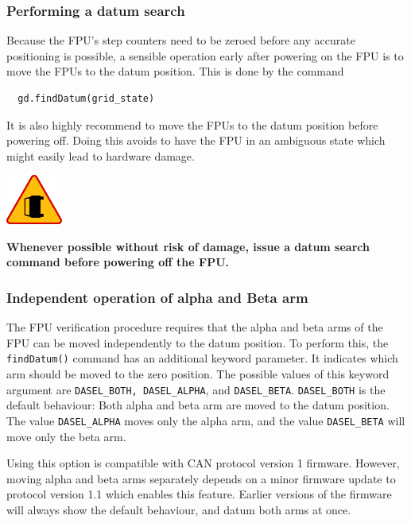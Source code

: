 \documentclass[11pt,a4paper]{report}
\newenvironment{warning}{\begin{framed}\includegraphics[width=5em]{accident-area-ahead.png}
}{\end{framed}}
\begin{document}
\subsubsection{Performing a datum search}

Because the FPU's step counters need to be zeroed
before any accurate positioning is possible, a
sensible operation early after powering on
the FPU is to move the FPUs to the datum position.
This is done by the command

\begin{verbatim}
  gd.findDatum(grid_state)
\end{verbatim}

It is also highly recommend to move the FPUs to the datum position
before powering off. Doing this avoids to have the FPU in an ambiguous
state which might easily lead to hardware damage.

\begin{warning}
  \textbf{Whenever possible without risk of damage, issue a datum
    search command before powering off the FPU.}
\end{warning}

\subsubsection{Independent operation of alpha and Beta arm}

The FPU verification procedure requires that the alpha and beta arms
of the FPU can be moved independently to the datum position.  To
perform this, the \texttt{findDatum()} command has an additional
keyword parameter. It indicates which arm should be moved to the zero
position. The possible values of this keyword argument are
\texttt{DASEL\_BOTH, DASEL\_ALPHA}, and \texttt{DASEL\_BETA}.
\texttt{DASEL\_BOTH} is the default behaviour: Both alpha and beta arm
are moved to the datum position. The value \texttt{DASEL\_ALPHA} moves
only the alpha arm, and the value \texttt{DASEL\_BETA} will move only
the beta arm.

Using this option is compatible with CAN protocol version 1
firmware. However, moving alpha and beta arms separately depends on a
minor firmware update to protocol version 1.1 which enables this
feature. Earlier versions of the firmware will always show the default
behaviour, and datum both arms at once.
\end{document}
